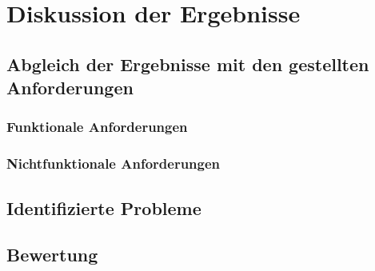 \chapter{Diskussion der Ergebnisse}
\label{ch:discussion}

\section{Abgleich der Ergebnisse mit den gestellten Anforderungen}

\subsection{Funktionale Anforderungen}
\subsection{Nichtfunktionale Anforderungen}

\section{Identifizierte Probleme}
\section{Bewertung}
